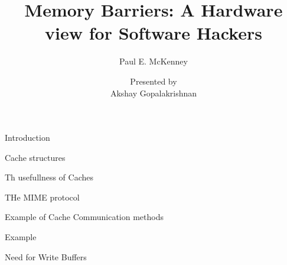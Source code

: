 \documentclass[notes, xcolor = dvipsnames]{beamer}
\title{Memory Barriers: A Hardware view for Software Hackers}
\subtitle{Paul E. McKenney}
\author{Presented by \\ Akshay Gopalakrishnan}
\begin{document}
  
    \begin{frame}
        
        \maketitle
    \end{frame}


    \begin{frame}{Introduction}
        

    \end{frame}

    \begin{frame}{Cache structures}
        
    \end{frame}

    \begin{frame}{Th usefullness of Caches}
        
    \end{frame}

    \begin{frame}{THe MIME protocol}
        
    \end{frame}

    \begin{frame}{Example of Cache Communication methods}
        
    \end{frame}

    \begin{frame}{Example}
        
    \end{frame}

    \begin{frame}{Need for Write Buffers}
        
    \end{frame}
\end{document}

